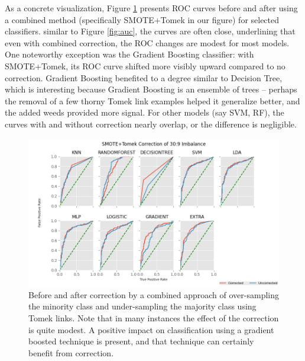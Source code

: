 \documentclass[agriengineering,article,submit,pdftex,moreauthors]{Definitions/mdpi}
\begin{document}
As a concrete visualization, Figure \ref{fig:auc-tomek} presents ROC curves before and after using a combined method (specifically SMOTE+Tomek in our figure) for selected classifiers. similar to Figure \ref{fig:auc}, the curves are often close, underlining that even with combined correction, the ROC changes are modest for most models. One noteworthy exception was the Gradient Boosting classifier: with SMOTE+Tomek, its ROC curve shifted more visibly upward compared to no correction. Gradient Boosting benefited to a degree similar to Decision Tree, which is interesting because Gradient Boosting is an ensemble of trees – perhaps the removal of a few thorny Tomek link examples helped it generalize better, and the added weeds provided more signal. For other models (say SVM, RF), the curves with and without correction nearly overlap, or the difference is negligible.

\begin{figure}[h]
	\centering
	\includegraphics[height=0.25\textheight]{figures/roc-corrected-tomek.png}
	\caption[Before and after correction]{Before and after correction by a combined approach of over-sampling the minority class and under-sampling the majority class using Tomek links. Note that in many instances the effect of the correction is quite modest. A positive impact on classification using a gradient boosted technique is present, and that technique can certainly benefit from correction. }
	\label{fig:auc-tomek}
\end{figure}
\end{document}
